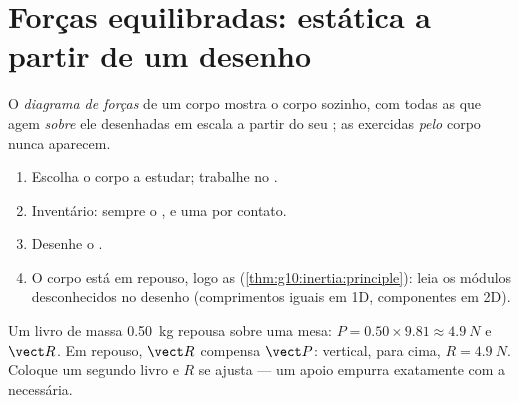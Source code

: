 \section{Forças equilibradas: estática a partir de um desenho}

\begin{definition}\label{def:g10:inertia:diagram}
O \emph{diagrama de forças} de um corpo mostra
o corpo sozinho, com todas as  que agem \emph{sobre} ele desenhadas
em escala a partir do seu ; as  exercidas
\emph{pelo} corpo nunca aparecem.
\end{definition}

\begin{method}\label{met:g10:inertia:method}
\begin{enumerate}
  \item Escolha o corpo a estudar; trabalhe no .
  \item Inventário: sempre o , e uma  por contato.
  \item Desenhe o .
  \item O corpo está em repouso, logo as  
        (\cref{thm:g10:inertia:principle}): leia os módulos desconhecidos
        no desenho (comprimentos iguais em 1D, componentes em 2D).
\end{enumerate}
\end{method}

\begin{example}\label{ex:g10:inertia:book}
Um livro de massa \qty{0.50}{kg} repousa sobre uma mesa: 
$P = 0.50 \times 9.81 \approx \qty{4.9}{N}$ e  $\vect R$. Em
repouso, $\vect R$ compensa $\vect P$: vertical, para cima,
$R = \qty{4.9}{N}$. Coloque um segundo livro e $R$ se ajusta --- um apoio
empurra exatamente com a  necessária.
\end{example}

